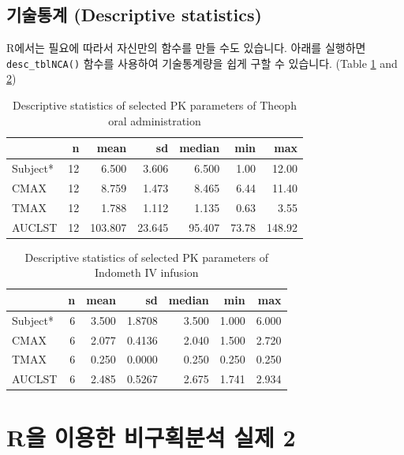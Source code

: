 \documentclass[
  11pt,
  krantz2, a4paper, twoside]{krantz}
\begin{document}
\hypertarget{uxae30uxc220uxd1b5uxacc4-descriptive-statistics}{%
\subsection{기술통계 (Descriptive statistics)}\label{uxae30uxc220uxd1b5uxacc4-descriptive-statistics}}

R에서는 필요에 따라서 자신만의 함수를 만들 수도 있습니다.
아래를 실행하면 \texttt{desc\_tblNCA()} 함수를 사용하여 기술통계량을 쉽게 구할 수 있습니다. (Table \ref{tab:theodesc} and \ref{tab:indodesc})

\begin{table}

\caption{\label{tab:theodesc}Descriptive statistics of selected PK parameters of Theoph oral administration}
\centering
\begin{tabular}[t]{lrrrrrr}
\toprule
  & n & mean & sd & median & min & max\\
\midrule
Subject* & 12 & 6.500 & 3.606 & 6.500 & 1.00 & 12.00\\
CMAX & 12 & 8.759 & 1.473 & 8.465 & 6.44 & 11.40\\
TMAX & 12 & 1.788 & 1.112 & 1.135 & 0.63 & 3.55\\
AUCLST & 12 & 103.807 & 23.645 & 95.407 & 73.78 & 148.92\\
\bottomrule
\end{tabular}
\end{table}

\begin{table}

\caption{\label{tab:indodesc}Descriptive statistics of selected PK parameters of Indometh IV infusion}
\centering
\begin{tabular}[t]{lrrrrrr}
\toprule
  & n & mean & sd & median & min & max\\
\midrule
Subject* & 6 & 3.500 & 1.8708 & 3.500 & 1.000 & 6.000\\
CMAX & 6 & 2.077 & 0.4136 & 2.040 & 1.500 & 2.720\\
TMAX & 6 & 0.250 & 0.0000 & 0.250 & 0.250 & 0.250\\
AUCLST & 6 & 2.485 & 0.5267 & 2.675 & 1.741 & 2.934\\
\bottomrule
\end{tabular}
\end{table}

\hypertarget{ruxc744-uxc774uxc6a9uxd55c-uxbe44uxad6cuxd68duxbd84uxc11d-uxc2e4uxc81c-2}{%
\section{R을 이용한 비구획분석 실제 2}\label{ruxc744-uxc774uxc6a9uxd55c-uxbe44uxad6cuxd68duxbd84uxc11d-uxc2e4uxc81c-2}}
\end{document}
